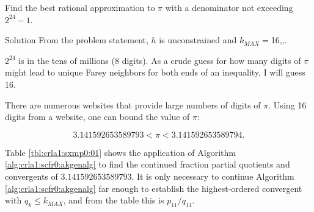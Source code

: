 \begin{vworkexamplestatement}
\label{exmp:crla1:sxmp0:01}
Find the best rational approximation to $\pi$ with a denominator not exceeding $2^{24}-1$.
\end{vworkexamplestatement}
\begin{vworkexampleparsection}{Solution} From the problem statement,
$h$ is unconstrained and $k_{MAX}=$16,,.

$2^{24}$ is in the tens of millions (8 digits)\@.  As a crude guess for
how many digits of $\pi$ might lead to unique Farey neighbors for both
ends of an inequality, I will guess 16.

There are numerous websites that provide large numbers of digits of $\pi$\@.
Using 16 digits from a website, one can bound the value of $\pi$:

\begin{equation}
3.141592653589793 < \pi < 3.141592653589794.
\end{equation}

Table \ref{tbl:crla1:sxmp0:01} shows the application of Algorithm
\ref{alg:crla1:scfr0:akgenalg} to find the continued fraction partial
quotients and convergents of $3.141592653589793$\@.  It is only necessary
to continue Algorithm \ref{alg:crla1:scfr0:akgenalg} far enough to establish
the highest-ordered convergent with $q_k \leq k_{MAX}$, and from the table this
is $p_{11}/q_{11}$.


\end{vworkexampleparsection}
